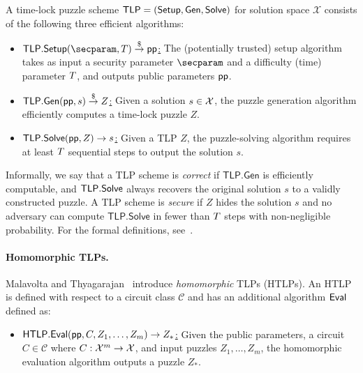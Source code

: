 \begin{definition} A time-lock puzzle scheme $\sf TLP = (\mathsf{Setup}, \mathsf{Gen}, \mathsf{Solve})$ for solution space $\mathcal{X}$ consists of the following three efficient algorithms:
    \begin{itemize}
        \item \underline{$\mathsf{TLP.Setup}(\secparam, \Ttime) \randout \pp$:} The (potentially trusted) setup algorithm takes as input a security parameter $\secparam$ and a difficulty (time) parameter $T$, and outputs public parameters $\mathsf{pp}$. %
        \item \underline{$\mathsf{TLP.Gen}(\mathsf{pp}, s) \stackrel{\$}{\to} Z$:} Given a solution $s \in \mathcal{X}$, the puzzle generation algorithm efficiently computes a time-lock puzzle $Z$.
        \item \underline{$\mathsf{TLP.Solve}(\mathsf{pp}, Z) \rightarrow s$:} Given a TLP $Z$, the puzzle-solving algorithm requires at least $T$ sequential steps to output the solution $s$.
    \end{itemize}
\end{definition}

Informally, we say that a TLP scheme is \emph{correct} if $\mathsf{TLP.Gen}$ is efficiently computable, and $\mathsf{TLP}.{\sf Solve}$ always recovers the original solution $s$ to a validly constructed puzzle. A TLP scheme is \emph{secure} if $Z$ hides the solution $s$ and no adversary can compute $\mathsf{TLP.Solve}$ in fewer than $T$ steps with non-negligible probability. For the formal definitions, see~\cite{C:MalThy19}.

\paragraph{Homomorphic TLPs.}
Malavolta and Thyagarajan~\cite{C:MalThy19} introduce \emph{homomorphic} TLPs (HTLPs). An HTLP is defined with respect to a circuit class $\mathcal{C}$ and has an additional algorithm $\sf Eval$ defined as:
\begin{itemize}
    \item \underline{$\mathsf{HTLP}.{\sf Eval}(\mathsf{pp}, C, Z_1, \dots, Z_m) \rightarrow Z_*$:} Given the public parameters, a circuit $C \in \mathcal{C}$ where $C: \mathcal{X}^m \rightarrow \mathcal{X}$, and input puzzles $Z_1, \dots, Z_m$, the homomorphic evaluation algorithm outputs a puzzle $Z_*$.
\end{itemize}

